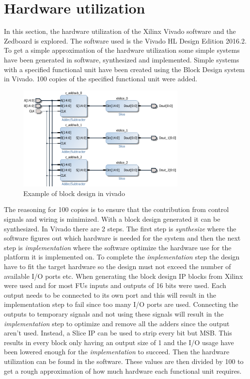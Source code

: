 \section{Hardware utilization}
In this section, the hardware utilization of the Xilinx Vivado software and the Zedboard is explored. The software used is the Vivado HL Design Edition 2016.2. To get a simple approximation of the hardware utilization some simple systems have been generated in software, synthesized and implemented. Simple systems with a specified functional unit have been created using the Block Design system in Vivado. 100 copies of the specified functional unit were added. 
\begin{figure}[ht!]
  \centering
  \includegraphics[width=0.75\textwidth]{figures/Blockdesignexample.png}
  \caption{Example of block design in vivado}
  \label{fig:blodesexa}
\end{figure}
The reasoning for 100 copies is to ensure that the contribution from control signals and wiring is minimized. With a block design generated it can be synthesized. In Vivado there are 2 steps. The first step is \textit{synthesize} where the software figures out which hardware is needed for the system and then the next step is \textit{implementation} where the software optimize the hardware use for the platform it is implemented on. To complete the \textit{implementation} step the design have to fit the target hardware so the design must not exceed the number of available I/O ports etc. When generating the block design IP blocks from Xilinx were used and for most FUs inputs and outputs of 16 bits were used. Each output needs to be connected to its own port and this will result in the implementation step to fail since too many I/O ports are used. Connecting the outputs to temporary signals and not using these signals will result in the \textit{implementation} step to optimize and remove all the adders since the output aren't used. Instead, a Slice IP can be used to strip every bit but MSB. This results in every block only having an output size of \SI{1}{\bit} and the I/O usage have been lowered enough for the \textit{implementation} to succeed. Then the hardware utilization can be found in the software. These values are then divided by 100 to get a rough approximation of how much hardware each functional unit requires.\\
